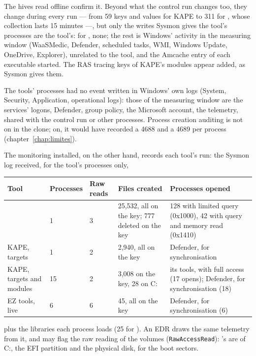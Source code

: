 \documentclass[11pt,a4paper,oneside]{report}
\begin{document}
The hives read offline confirm it. Beyond what the control run changes too,
they change during every run --- from 59 keys and values for KAPE to 311 for
\wac{}, whose collection lasts 15 minutes ---, but only the writes Sysmon
gives the tool's processes are the tool's: for \wac{}, none; the rest is
Windows' activity in the measuring window (WaaSMedic, Defender, scheduled
tasks, WMI, Windows Update, OneDrive, Explorer), unrelated to the tool, and
the Amcache entry of each executable started. The RAS tracing keys of KAPE's
modules appear added, as Sysmon gives them.

The tools' processes had no event written in Windows' own logs (System,
Security, Application, operational logs): those of the measuring window are
the services' logons, Defender, group policy, the Microsoft account, the
telemetry, shared with the control run or other processes. Process creation
auditing is not on in the clone; on, it would have recorded a 4688 and a 4689
per process (chapter~\ref{chap:limites}).

The monitoring installed, on the other hand, records each tool's run: the
Sysmon log received, for the tool's processes only,

\begin{longtable}{@{}L{2.6cm}L{2.0cm}L{1.8cm}L{3.8cm}L{4.4cm}@{}}
\toprule
\textbf{Tool} & \textbf{Processes} & \textbf{Raw reads} & \textbf{Files created} & \textbf{Processes opened} \\
\midrule\endhead
\wac{} & 1 & 3 & 25,532, all on the key; 777 deleted on the key & 128 with limited query (0x1000), 42 with query and memory read (0x1410) \\
KAPE, targets & 1 & 2 & 2,940, all on the key & Defender, for synchronisation \\
KAPE, targets and modules & 15 & 2 & 3,008 on the key, 28 on C: & its tools, with full access (17 opens); Defender, for synchronisation (18) \\
EZ tools, live & 6 & 6 & 45, all on the key & Defender, for synchronisation (6) \\
\bottomrule
\end{longtable}

\noindent plus the libraries each process loads (25 for \wac{}). An EDR draws
the same telemetry from it, and may flag the raw reading of the volumes
(\texttt{RawAccessRead}): \wac{}'s are of C:, the EFI partition and the
physical disk, for the boot sectors.
\end{document}
